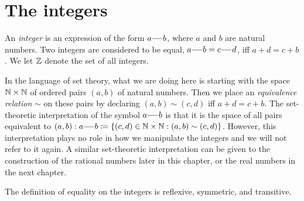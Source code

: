 \section{The integers}\label{i:sec:4.1}

\begin{defn}[Integers]\label{i:4.1.1}
  An \emph{integer} is an expression of the form \(a {-}\!{-} b\), where \(a\) and \(b\) are natural numbers.
  Two integers are considered to be equal, \(a {-}\!{-} b = c {-}\!{-} d\), iff \(a + d = c + b\).
  We let \(\mathbb{Z}\) denote the set of all integers.
\end{defn}

\begin{note}
  In the language of set theory, what we are doing here is starting with the space \(\mathbb{N} \times \mathbb{N}\) of ordered pairs \((a, b)\) of natural numbers.
  Then we place an \emph{equivalence relation} \(\sim\) on these pairs by declaring \((a, b) \sim (c, d)\) iff \(a + d = c + b\).
  The set-theoretic interpretation of the symbol \(a {-}\!{-} b\) is that it is the space of all pairs equivalent to \((a, b): a {-}\!{-} b \coloneqq \left\lbrace(c, d) \in \mathbb{N} \times \mathbb{N} : (a, b) \sim (c, d)\right\rbrace\).
  However, this interpretation plays no role in how we manipulate the integers and we will not refer to it again.
  A similar set-theoretic interpretation can be given to the construction of the rational numbers later in this chapter, or the real numbers in the next chapter.
\end{note}

\begin{ac}\label{i:ac:4.1.1}
  The definition of equality on the integers is reflexive, symmetric, and transitive.
\end{ac}

